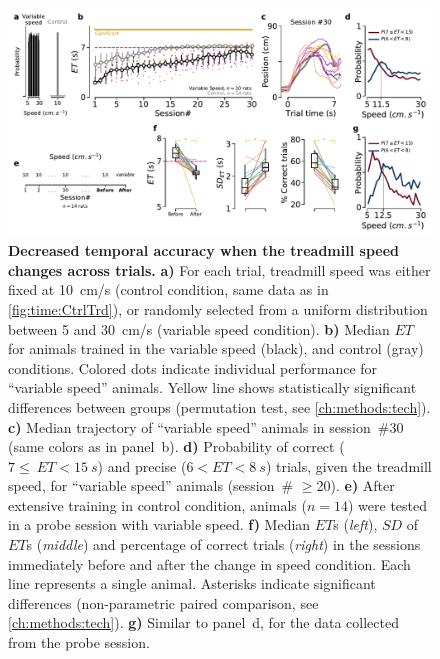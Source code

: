 \begin{figure}[bt!]
  \begin{center}
    \includegraphics[width=.8\linewidth]{ch-time/figures/VarTrd.pdf}
    \caption[Variable Speed Condition]
    {\textbf{Decreased temporal accuracy when the treadmill speed changes across trials.}
    \textbf{a)}
    For each trial, treadmill speed was either fixed at 10~cm/s (control condition, same data as in \autoref{fig:time:CtrlTrd}), or randomly selected from a uniform distribution between 5 and 30~cm/s (variable speed condition).
    \textbf{b)}
    Median $ET$ for animals trained in the variable speed (black), and control (gray) conditions.
    Colored dots indicate individual performance for ``variable speed'' animals.
    Yellow line shows statistically significant differences between groups (permutation test, see \autoref{ch:methods:tech}).
    \textbf{c)}
    Median trajectory of ``variable speed'' animals in session~\#30 (same colors as in panel~b).
    \textbf{d)}
    Probability of correct ($7\leq~ET<15~s$) and precise ($6<ET<8~s$) trials, given the treadmill speed, for ``variable speed'' animals (session~\# $\geq$20).
    \textbf{e)}
    After extensive training in control condition, animals ($n=14$) were tested in a probe session with variable speed.
    \textbf{f)}
    Median $ET$s (\textit{left}), $SD$ of $ET$s (\textit{middle}) and percentage of correct trials (\textit{right}) in the sessions immediately before and after the change in speed condition.
    Each line represents a single animal.
    Asterisks indicate significant differences (non-parametric paired comparison, see \autoref{ch:methods:tech}).
    \textbf{g)}
    Similar to panel~d, for the data collected from the probe session.
  }
  \label{fig:time:varTrd}
  \end{center}
\end{figure}